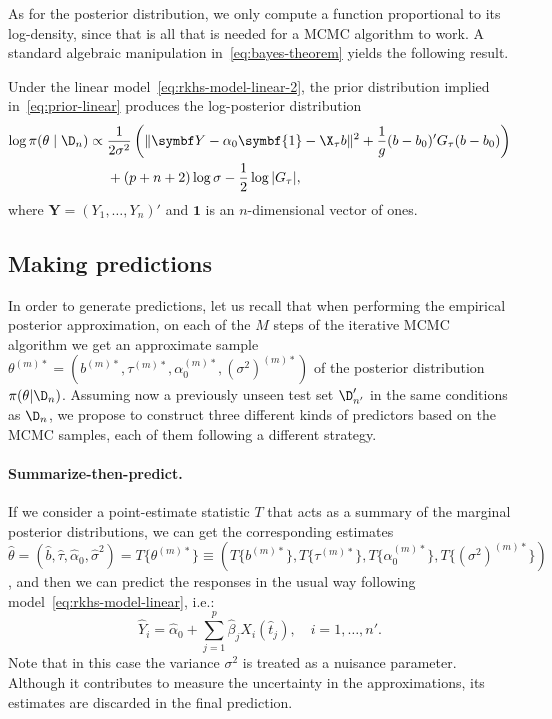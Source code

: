 As for the posterior distribution, we only compute a function proportional to its log-density, since that is all that is needed for a MCMC algorithm to work. A standard algebraic manipulation in~\eqref{eq:bayes-theorem} yields the following result.

\begin{proposition}
Under the linear model~\eqref{eq:rkhs-model-linear-2}, the prior distribution implied in~\eqref{eq:prior-linear} produces the log-posterior distribution
\begin{align*}
\log \pi(\theta \mid \D_n) \propto {} & \frac{1}{2\sigma^2}\left(\|\symbf Y- \alpha_0\symbf{1} - \X_\tau b\|^2 + \frac{1}{g}(b - b_0)'G_\tau(b - b_0) \right)\\
& + (p+n+2)\log\sigma - \frac{1}{2}\log |G_\tau|,
\end{align*}
where \(\symbf Y=(Y_1,\dots,Y_n)'\) and \(\symbf{1}\) is an \(n\)-dimensional vector of ones.
\end{proposition}

\subsection*{Making predictions}

In order to generate predictions, let us recall that when performing the empirical posterior approximation, on each of the \(M\) steps of the iterative MCMC algorithm we get an approximate sample \(\theta^{(m)*}=(b^{(m)*}, \tau^{(m)*}, \alpha_0^{(m)*}, (\sigma^2)^{(m)*})\) of the posterior distribution \(\pi(\theta| \D_n)\). Assuming now a previously unseen test set \(\D'_{n'}\) in the same conditions as \(\D_n\), we propose to construct three different kinds of predictors based on the MCMC samples, each of them following a different strategy.

  \paragraph{Summarize-then-predict.} If we consider a point-estimate statistic \(T\) that acts as a summary of the marginal posterior distributions, we can get the corresponding estimates \(\hat{\theta}=(\hat b, \hat \tau, \hat{\alpha}_0, \hat{\sigma}^2) = T\{\theta^{(m)*}\} \equiv (T\{b^{(m)*}\}, T\{\tau^{(m)*}\}, T\{\alpha_0^{(m)*}\}, T\{(\sigma^2)^{(m)*}\})\), and then we can predict the responses in the usual way following model~\eqref{eq:rkhs-model-linear}, i.e.:
  \begin{equation}\label{eq:summarize-predict-linear}
    \hat Y_i = \hat{\alpha}_0 + \sum_{j=1}^p \hat{\beta}_j X_i(\hat{t}_j), \quad i=1,\dots, n'.
  \end{equation}
  Note that in this case the variance \(\sigma^2\) is treated as a nuisance parameter. Although it contributes to measure the uncertainty in the approximations, its estimates are discarded in the final prediction.


